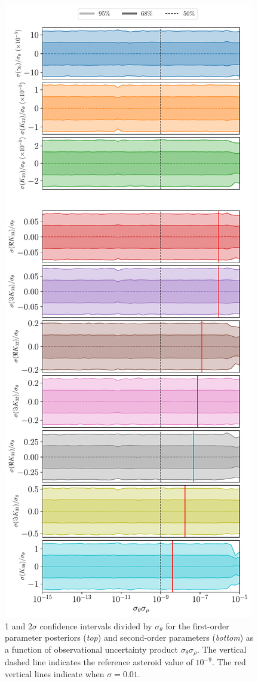 \documentclass[fleqn,usenatbib]{mnras}
\begin{document}
\begin{figure}
  \centering
  \includegraphics[height=0.89\textheight]{figs/scan-product.pdf}
  \caption{1 and 2$\sigma$ confidence intervals divided by $\sigma_\theta$ for the first-order parameter posteriors (\textit{top}) and second-order parameters (\textit{bottom}) as a function of observational uncertainty product $\sigma_\theta \sigma_\rho$. The vertical dashed line indicates the reference asteroid value of $10^{-9}$. The red vertical lines indicate when $\sigma =0.01$.}
  \label{fig:scan-product}
\end{figure}
\end{document}
